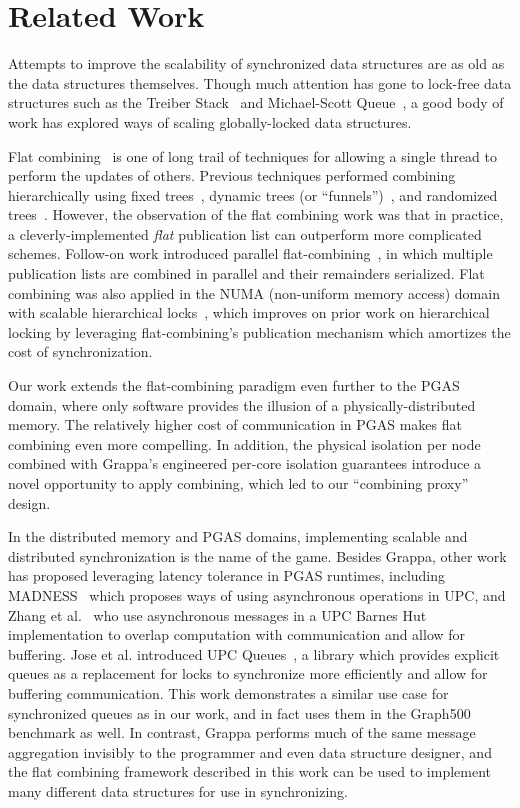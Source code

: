 \section{Related Work}
Attempts to improve the scalability of synchronized data structures are as old as the data structures themselves. Though much attention has gone to lock-free data structures such as the Treiber Stack~\cite{treiber} and Michael-Scott Queue~\cite{msqueue}, a good body of work has explored ways of scaling globally-locked data structures.

Flat combining~\cite{flatCombining} is one of long trail of techniques for allowing a single thread to perform the updates of others. Previous techniques performed combining hierarchically using fixed trees~\cite{yew:combining-trees}, dynamic trees (or ``funnels'')~\cite{funnels}, and randomized trees~\cite{edtrees}. However, the observation of the flat combining work was that in practice, a cleverly-implemented \emph{flat} publication list can outperform more complicated schemes.
Follow-on work introduced parallel flat-combining~\cite{scalableFCQueues}, in which multiple publication lists are combined in parallel and their remainders serialized.
Flat combining was also applied in the NUMA (non-uniform memory access) domain with scalable hierarchical locks~\cite{fcNUMALocks}, which improves on prior work on hierarchical locking by leveraging flat-combining's publication mechanism which amortizes the cost of synchronization.

Our work extends the flat-combining paradigm even further to the PGAS domain, where only software provides the illusion of a physically-distributed memory. The relatively higher cost of communication in PGAS makes flat combining even more compelling. In addition, the physical isolation per node combined with Grappa's engineered per-core isolation guarantees introduce a novel opportunity to apply combining, which led to our ``combining proxy'' design.

In the distributed memory and PGAS domains, implementing scalable and distributed synchronization is the name of the game.
Besides Grappa, other work has proposed leveraging latency tolerance in PGAS runtimes, including MADNESS~\cite{shet:async-upc} which proposes ways of using asynchronous operations in UPC, and Zhang et al.~\cite{zhang:barnes-hut} who use asynchronous messages in a UPC Barnes Hut implementation to overlap computation with communication and allow for buffering.
Jose et al. introduced UPC Queues~\cite{jose:upc-queues}, a library which provides explicit queues as a replacement for locks to synchronize more efficiently and allow for buffering communication. This work demonstrates a similar use case for synchronized queues as in our work, and in fact uses them in the Graph500 benchmark as well. In contrast, Grappa performs much of the same message aggregation invisibly to the programmer and even data structure designer, and the flat combining framework described in this work can be used to implement many different data structures for use in synchronizing.


